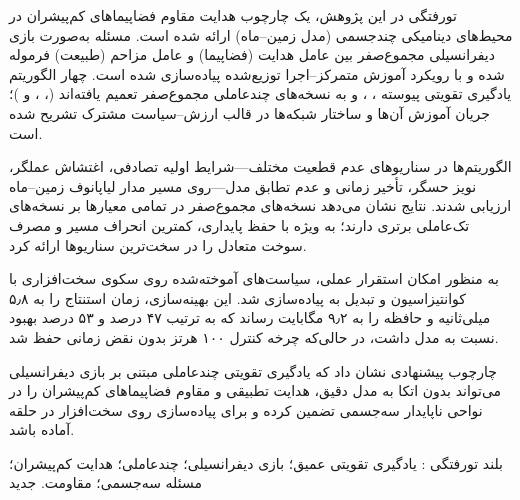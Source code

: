 

\pagestyle{plain}

\begin{وسط‌چین}
\end{وسط‌چین}

‌تورفتگی 
در این پژوهش، یک چارچوب هدایت مقاوم فضاپیماهای کم‌پیشران در محیط‌های دینامیکی چندجسمی (مدل  زمین–ماه) ارائه شده است. مسئله به‌صورت بازی دیفرانسیلی مجموع‌صفر بین عامل هدایت (فضاپیما) و عامل مزاحم (طبیعت) فرموله شده و با رویکرد آموزش متمرکز–اجرا توزیع‌شده پیاده‌سازی شده است. چهار الگوریتم یادگیری تقویتی پیوسته ، ،  و  به نسخه‌های چندعاملی مجموع‌صفر تعمیم یافته‌اند (، ،  و )؛ جریان آموزش آن‌ها و ساختار شبکه‌ها در قالب ارزش–سیاست مشترک تشریح شده است.

الگوریتم‌ها در سناریوهای عدم قطعیت مختلف—شرایط اولیه تصادفی، اغتشاش عملگر، نویز حسگر، تأخیر زمانی و عدم تطابق مدل—روی مسیر مدار لیاپانوف زمین–ماه ارزیابی شدند. نتایج نشان می‌دهد نسخه‌های مجموع‌صفر در تمامی معیارها بر نسخه‌های تک‌عاملی برتری دارند؛ به ویژه  با حفظ پایداری، کمترین انحراف مسیر و مصرف سوخت متعادل را در سخت‌ترین سناریوها ارائه کرد.

به منظور امکان استقرار عملی، سیاست‌های آموخته‌شده روی سکوی سخت‌افزاری  با کوانتیزاسیون  و تبدیل به  پیاده‌سازی شد. این بهینه‌سازی، زمان استنتاج را به ۵٫۸ میلی‌ثانیه و حافظه را به ۹٫۲ مگابایت رساند که به ترتیب ۴۷ درصد و ۵۳ درصد بهبود نسبت به مدل  داشت، در حالی‌که چرخه کنترل ۱۰۰ هرتز بدون نقض زمانی حفظ شد.

چارچوب پیشنهادی نشان داد که یادگیری تقویتی چندعاملی مبتنی بر بازی دیفرانسیلی می‌تواند بدون اتکا به مدل دقیق، هدایت تطبیقی و مقاوم فضاپیماهای کم‌پیشران را در نواحی ناپایدار سه‌جسمی تضمین کرده و برای پیاده‌سازی روی سخت‌افزار در حلقه آماده باشد.


‌بلند
‌تورفتگی : 
 یادگیری تقویتی عمیق؛ بازی دیفرانسیلی؛ چندعاملی؛ هدایت کم‌پیشران؛ مسئله سه‌جسمی؛ مقاومت.
‌جدید
